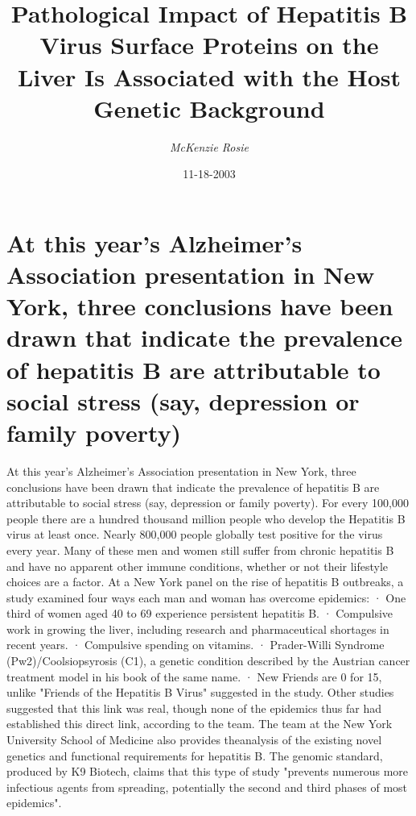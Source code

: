 \documentclass{article}%
\title{Pathological Impact of Hepatitis B Virus Surface Proteins on the Liver Is Associated with the Host Genetic Background}%
\author{\textit{McKenzie Rosie}}%
\date{11-18-2003}%
\begin{document}
%
\normalsize%
\maketitle%
\section{At this year's Alzheimer's Association presentation in New York, three conclusions have been drawn that indicate the prevalence of hepatitis B are attributable to social stress (say, depression or family poverty)}%
\label{sec:AtthisyearsAlzheimersAssociationpresentationinNewYork,threeconclusionshavebeendrawnthatindicatetheprevalenceofhepatitisBareattributabletosocialstress(say,depressionorfamilypoverty)}%
At this year's Alzheimer's Association presentation in New York, three conclusions have been drawn that indicate the prevalence of hepatitis B are attributable to social stress (say, depression or family poverty).\newline%
For every 100,000 people there are a hundred thousand million people who develop the Hepatitis B virus at least once. Nearly 800,000 people globally test positive for the virus every year. Many of these men and women still suffer from chronic hepatitis B and have no apparent other immune conditions, whether or not their lifestyle choices are a factor.\newline%
At a New York panel on the rise of hepatitis B outbreaks, a study examined four ways each man and woman has overcome epidemics:\newline%
· One third of women aged 40 to 69 experience persistent hepatitis B.\newline%
· Compulsive work in growing the liver, including research and pharmaceutical shortages in recent years.\newline%
· Compulsive spending on vitamins.\newline%
· Prader{-}Willi Syndrome (Pw2)/Coolsiopsyrosis (C1), a genetic condition described by the Austrian cancer treatment model in his book of the same name.\newline%
· New Friends are 0 for 15, unlike "Friends of the Hepatitis B Virus" suggested in the study. Other studies suggested that this link was real, though none of the epidemics thus far had established this direct link, according to the team. The team at the New York University School of Medicine also provides theanalysis of the existing novel genetics and functional requirements for hepatitis B. The genomic standard, produced by K9 Biotech, claims that this type of study "prevents numerous more infectious agents from spreading, potentially the second and third phases of most epidemics".\newline%
\end{document}
